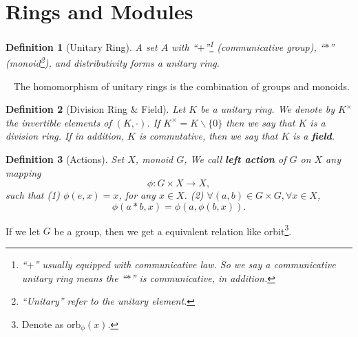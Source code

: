 \documentclass{article}
\theoremstyle{1}
\newtheorem{definition}{Definition}[section]
\begin{document}
\section{Rings and Modules}
\begin{definition}[Unitary Ring]
    A set $A$ with ``$+$''\footnote{``$+$'' usually equipped with communicative law. So we say a communicative unitary ring means the ``$*$'' is communicative, in addition.} (communicative group), ``$*$'' (monoid\footnote{``Unitary'' refer to the unitary element.}), and distributivity forms a unitary ring.
\end{definition}
\ \newline
The homomorphism of unitary rings is the combination of groups and monoids.
\begin{definition}[Division Ring \& Field]
    Let $K$ be a unitary ring. We denote by $K^\times$ the invertible elements of $(K, \cdot)$. If $K^\times=K\backslash\{0\}$ then we say that $K$ is a division ring. If in addition,  $K$ is commutative,  then we say that $K$ is a \textbf{field}.
\end{definition}
\begin{definition}[Actions]
    Set $X$, monoid $G$, We call \textbf{left action} of $G$ on $X$ any mapping 
    $$\phi:G\times X\rightarrow X, $$
    such that 
    \newline
    (1) $\phi(e, x)=x$,  for any $x\in X$.
    \newline
    (2) $\forall (a, b)\in G\times G, \forall x\in X$, 
    $$\phi(a*b, x)=\phi(a, \phi(b, x)).$$
\end{definition}
If we let $G$ be a group, then we get a equivalent relation like orbit\footnote{Denote as $\mathrm{orb}_\phi(x)$.}.
\end{document}
